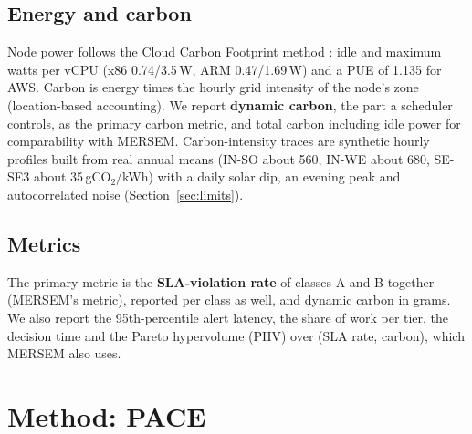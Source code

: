 \documentclass[11pt,a4paper]{article}
\newcommand{\gco}{gCO$_2$}
\begin{document}
\subsection{Energy and carbon}
Node power follows the Cloud Carbon Footprint method \cite{ccf}: idle and maximum watts per vCPU (x86 0.74/3.5\,W, ARM 0.47/1.69\,W) and a PUE of 1.135 for AWS. Carbon is energy times the hourly grid intensity of the node's zone (location-based accounting). We report \textbf{dynamic carbon}, the part a scheduler controls, as the primary carbon metric, and total carbon including idle power for comparability with MERSEM. Carbon-intensity traces are synthetic hourly profiles built from real annual means (IN-SO about 560, IN-WE about 680, SE-SE3 about 35\,\gco/kWh) with a daily solar dip, an evening peak and autocorrelated noise (Section~\ref{sec:limits}).

\subsection{Metrics}
The primary metric is the \textbf{SLA-violation rate} of classes A and B together (MERSEM's metric), reported per class as well, and dynamic carbon in grams. We also report the 95th-percentile alert latency, the share of work per tier, the decision time and the Pareto hypervolume (PHV) over (SLA rate, carbon), which MERSEM also uses.

\section{Method: PACE}\label{sec:method}
\end{document}

